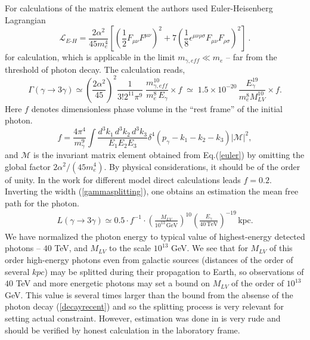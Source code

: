 \documentclass[12pt]{article}
\def\l{\left(}
\def\r{\right)}
\newcommand{\be}{\begin{equation}}
\newcommand{\ee}{\end{equation}}
\begin{document}
For calculations of the matrix element the authors used Euler-Heisenberg Lagrangian
\begin{equation}
\mathcal{L}_{E\mbox{-}H}=\frac{2 \alpha^2}{45 m_e^4}
\left[\left(\frac 12 F_{\mu\nu}F^{\mu\nu}\right)^2 
+7 \left(\frac 18 \epsilon^{\mu\nu\rho\sigma} 
F_{\mu\nu}F_{\rho\sigma}\right)^2\right]~.
\label{euler}
\end{equation}
for calculation, which is applicable in the limit $m_{\gamma, eff} \ll m_e$ -- far from the threshold of photon decay. The calculation \cite{Gelmini:2005gy} reads,
\be\label{gammasplitting}
\Gamma \l\gamma \to 3\gamma\r \simeq \left( \frac{2\alpha^2}{45}\right)^2\frac{1}{3! 2^{11}\pi^9}\;\frac{m_{\gamma, eff}^{10}}{m_e^8 \, E_\gamma} \times f \;\simeq\; 1.5 \times 10^{-20}\,\frac{E_\gamma^{19}}{m_e^8 M_{LV}^{10}} \times f.
\ee 
Here $f$ denotes dimensionless phase volume in the ``rest frame'' of the initial photon. 
\begin{equation}
f=\frac{4 \pi^4}{m_\gamma^9}\int 
\frac{d^3k_1\,d^3k_2\,d^3k_3}{E_1E_2E_3}
\delta^4(p_\gamma-k_1-k_2-k_3)\left|\mathcal{M}\right|^2,
\end{equation}
 and  $\mathcal{M}$ is the invariant matrix element 
obtained from Eq.(\ref{euler}) by omitting the global factor 
${2 \alpha^2}/({45 m_e^4})$.
By physical considerations, it should be of the order of unity. In the work \cite{Adam:2002rg} for different model direct calculations leads $f=0.2$. Inverting the width (\ref{gammasplitting}), one obtains an estimation the mean free path for the photon.
\begin{align} \label{Distance_L}
L  \l\gamma \to 3\gamma\r \simeq 0.5 \cdot f^{-1}\cdot \left(\frac{M_{LV}}{10^{13}\,\mbox{GeV}}\right)^{10}\l \frac{E_\gamma}{40\, \mbox{TeV}}\r^{-19}\,\mbox{kpc}.
\end{align}
We have  normalized the photon energy to typical value of highest-energy detected photons -- $40$ TeV, and $M_{LV}$ to the scale $10^{13}$ GeV. We see that for $M_{LV}$ of this order high-energy photons even from galactic sources (distances of the order of several $kpc$) may be splitted during their propagation to Earth, so observations of $40$ TeV and more energetic photons may set a bound on $M_{LV}$ of the order of $10^{13}$ GeV. This value is several times larger than the bound from the absense of the photon decay (\ref{decayrecent}) and so the splitting process is very relevant for setting actual constraint. However, estimation was done in \cite{Gelmini:2005gy} is very rude and should be verified by honest calculation in the laboratory frame.
\end{document}
